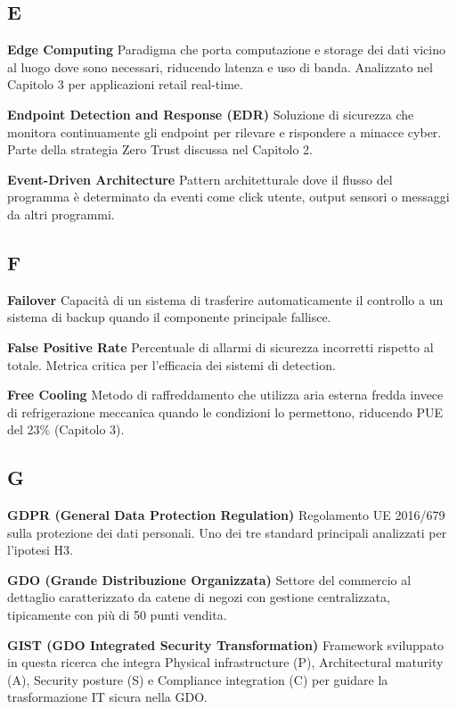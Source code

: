 \documentclass{report}
\begin{document}
\subsection{E}\label{e}

\textbf{Edge Computing} Paradigma che porta computazione e storage dei
dati vicino al luogo dove sono necessari, riducendo latenza e uso di
banda. Analizzato nel Capitolo 3 per applicazioni retail real-time.

\textbf{Endpoint Detection and Response (EDR)} Soluzione di sicurezza
che monitora continuamente gli endpoint per rilevare e rispondere a
minacce cyber. Parte della strategia Zero Trust discussa nel Capitolo 2.

\textbf{Event-Driven Architecture} Pattern architetturale dove il flusso
del programma è determinato da eventi come click utente, output sensori
o messaggi da altri programmi.

\subsection{F}\label{f}

\textbf{Failover} Capacità di un sistema di trasferire automaticamente
il controllo a un sistema di backup quando il componente principale
fallisce.

\textbf{False Positive Rate} Percentuale di allarmi di sicurezza
incorretti rispetto al totale. Metrica critica per l'efficacia dei
sistemi di detection.

\textbf{Free Cooling} Metodo di raffreddamento che utilizza aria esterna
fredda invece di refrigerazione meccanica quando le condizioni lo
permettono, riducendo PUE del 23\% (Capitolo 3).

\subsection{G}\label{g}

\textbf{GDPR (General Data Protection Regulation)} Regolamento UE
2016/679 sulla protezione dei dati personali. Uno dei tre standard
principali analizzati per l'ipotesi H3.

\textbf{GDO (Grande Distribuzione Organizzata)} Settore del commercio al
dettaglio caratterizzato da catene di negozi con gestione centralizzata,
tipicamente con più di 50 punti vendita.

\textbf{GIST (GDO Integrated Security Transformation)} Framework
sviluppato in questa ricerca che integra Physical infrastructure (P),
Architectural maturity (A), Security posture (S) e Compliance
integration (C) per guidare la trasformazione IT sicura nella GDO.
\end{document}
